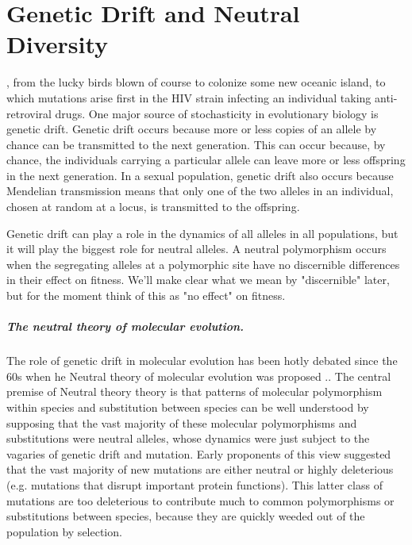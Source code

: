\chapter{Genetic Drift and Neutral Diversity}
\label{Chapter:Drift}
, from the lucky birds blown of course to colonize some new oceanic island, to which mutations arise first in the HIV strain infecting an individual taking anti-retroviral drugs. One major source of stochasticity in evolutionary biology is genetic drift.  Genetic drift occurs because more or less copies of an allele by chance can be transmitted to the next generation. This can occur because, by chance, the individuals carrying a particular allele can leave more or less offspring in the next generation. In a
sexual population, genetic drift also occurs because Mendelian transmission
means that only one of the two alleles in an individual, chosen at random at a
locus, is transmitted to the offspring. 

Genetic drift can play a role in the dynamics of all alleles in all populations, but it will play the biggest role for neutral alleles. A neutral polymorphism occurs when the segregating alleles at a polymorphic site have no discernible differences in their effect on fitness. We'll make clear what we mean by "discernible" later, but for
the moment think of this as "no effect" on fitness. 
\paragraph{The neutral theory of molecular evolution.} 
The role of genetic drift in molecular evolution has been hotly debated since the 60s when he Neutral theory of molecular evolution was proposed \citep[see ][ for a history]{ohta1996development}.\cite{kimura:68,king:69,kimura:83}.  The central premise of Neutral theory theory is that patterns of molecular polymorphism within species and substitution between species can be well understood by supposing that the vast majority of these molecular polymorphisms and substitutions were neutral alleles, whose dynamics were just subject to the vagaries of genetic drift and mutation. Early proponents of this view suggested that the vast majority of new mutations are either neutral or highly deleterious (e.g. mutations that disrupt important protein functions). This latter class of mutations are too deleterious to contribute much to common polymorphisms or substitutions between species, because they are quickly weeded out of the population by selection. 

